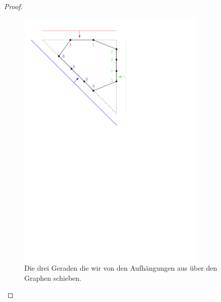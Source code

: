 \begin{proof}
\begin{figure}
\centering
\begin{minipage}{0.2\textwidth}
  \end{minipage}
  \begin{minipage}{0.45\textwidth}
  \centering
    \includegraphics[width=0.8\textwidth]{sweeplines1.pdf}
    \caption{Die drei Geraden die wir von den Aufhängungen aus über den Graphen schieben.}
    \label{sweeplines1}
  \end{minipage}
  \hfill
  \begin{minipage}{0.45\textwidth}
 \centering

\end{minipage}
\end{figure}
\end{proof}
